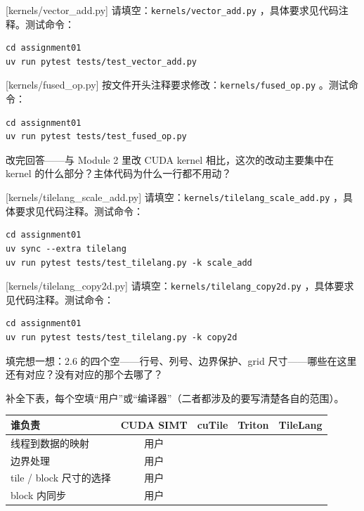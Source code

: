 \documentclass[11pt,a4paper,fontset=none]{ctexart}
\begin{document}
[kernels/vector\_add.py]
请填空：\texttt{kernels/vector\_add.py} ，具体要求见代码注释。测试命令：

\begin{lstlisting}
cd assignment01
uv run pytest tests/test_vector_add.py
\end{lstlisting}

[kernels/fused\_op.py]
按文件开头注释要求修改：\texttt{kernels/fused\_op.py} 。测试命令：

\begin{lstlisting}
cd assignment01
uv run pytest tests/test_fused_op.py
\end{lstlisting}

改完回答——与 Module 2 里改 CUDA kernel 相比，这次的改动主要集中在 kernel 的什么部分？主体代码为什么一行都不用动？

[kernels/tilelang\_scale\_add.py]
请填空：\texttt{kernels/tilelang\_scale\_add.py} ，具体要求见代码注释。测试命令：

\begin{lstlisting}
cd assignment01
uv sync --extra tilelang
uv run pytest tests/test_tilelang.py -k scale_add
\end{lstlisting}

[kernels/tilelang\_copy2d.py]
请填空：\texttt{kernels/tilelang\_copy2d.py} ，具体要求见代码注释。测试命令：

\begin{lstlisting}
cd assignment01
uv run pytest tests/test_tilelang.py -k copy2d
\end{lstlisting}

填完想一想：2.6 的四个空——行号、列号、边界保护、grid 尺寸——哪些在这里还有对应？没有对应的那个去哪了？

补全下表，每个空填“用户”或“编译器”（二者都涉及的要写清楚各自的范围）。

\begin{center}\small
\begin{tabular}{@{}lcccc@{}}
\toprule
谁负责 & CUDA SIMT & cuTile & Triton & TileLang \\
\midrule
线程到数据的映射 & 用户 & & & \\
边界处理 & 用户 & & & \\
tile / block 尺寸的选择 & 用户 & & & \\
block 内同步 & 用户 & & & \\
\bottomrule
\end{tabular}
\end{center}
\end{document}

